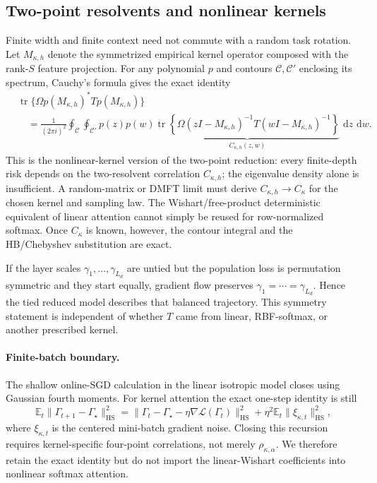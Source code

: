 \documentclass[11pt,a4paper]{article}
\numberwithin{equation}{section}
\theoremstyle{definition}
\theoremstyle{remark}
\newcommand{\E}{\mathbb E}
\newcommand{\loss}{\mathcal L}
\newcommand{\HS}{\mathrm{HS}}
\newcommand{\tr}{\operatorname{tr}}
\newcommand{\dd}{\,\mathrm d}
\begin{document}
\subsection{Two-point resolvents and nonlinear kernels}

Finite width and finite context need not commute with a random task rotation.
Let $M_{\kappa,h}$ denote the symmetrized empirical kernel operator composed
with the rank-$S$ feature projection.  For any polynomial $p$ and contours
$\mathcal C,\mathcal C'$ enclosing its spectrum, Cauchy's formula gives the
exact identity
\begin{align}
 &\tr\{\Omega p(M_{\kappa,h})^*T p(M_{\kappa,h})\}
 \nonumber\\
 &\quad=\frac{1}{(2\pi i)^2}
 \oint_{\mathcal C}\oint_{\mathcal C'}
 p(z)p(w)
 \underbrace{\tr\!\left\{
 \Omega(zI-M_{\kappa,h})^{-1}T
 (wI-M_{\kappa,h})^{-1}\right\}}
 _{C_{\kappa,h}(z,w)}\,\dd z\,\dd w.
 \label{eq:two-point-kernel-resolvent}
\end{align}
This is the nonlinear-kernel version of the two-point reduction: every
finite-depth risk depends on the two-resolvent correlation
$C_{\kappa,h}$; the eigenvalue density alone is insufficient. A random-matrix or DMFT
limit must derive $C_{\kappa,h}\to C_\kappa$ for the chosen kernel and sampling
law.  The Wishart/free-product deterministic equivalent of linear attention
cannot simply be reused for row-normalized softmax.  Once $C_\kappa$ is known,
however, the contour integral and the HB/Chebyshev substitution are exact.

If the layer scales $\gamma_1,\ldots,\gamma_{L_d}$ are untied but the
population loss is permutation symmetric and they start equally, gradient
flow preserves $\gamma_1=\cdots=\gamma_{L_d}$.  Hence the tied reduced model
describes that balanced trajectory.  This symmetry statement is independent
of whether $T$ came from linear, RBF-softmax, or another prescribed kernel.

\paragraph{Finite-batch boundary.}
The shallow online-SGD calculation in the linear isotropic model closes using
Gaussian fourth moments.  For kernel attention the exact one-step identity is
still
\begin{equation}
 \E_t\|\Gamma_{t+1}-\Gamma_\star\|_{\HS}^2
 =\|\Gamma_t-\Gamma_\star-\eta\nabla\loss(\Gamma_t)\|_{\HS}^2
 +\eta^2\E_t\|\xi_{\kappa,t}\|_{\HS}^2,
 \label{eq:sgd-noise-identity}
\end{equation}
where $\xi_{\kappa,t}$ is the centered mini-batch gradient noise.  Closing
this recursion requires kernel-specific four-point correlations, not merely
$\rho_{\kappa,\alpha}$.  We therefore retain the exact identity but do not
import the linear-Wishart coefficients into nonlinear softmax attention.
\end{document}
